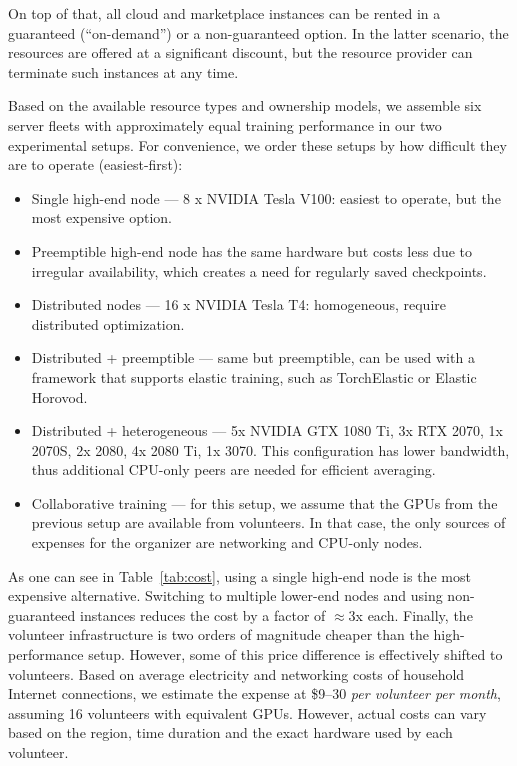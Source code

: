 On top of that, all cloud and marketplace instances can be rented in a guaranteed (``on-demand'') or a non-guaranteed option. In the latter scenario, the resources are offered at a significant discount, but the resource provider can terminate such instances at any time.

Based on the available resource types and ownership models, we assemble six server fleets with approximately equal training performance in our two experimental setups. For convenience, we order these setups by how difficult they are to operate (easiest-first):

\begin{itemize}[leftmargin=*]
    \item Single high-end node --- 8 x NVIDIA Tesla V100: easiest to operate, but the most expensive option.
    \item Preemptible high-end node has the same hardware but costs less due to irregular availability, which creates a need for regularly saved checkpoints.
    \item Distributed nodes --- 16 x NVIDIA Tesla T4: homogeneous, require distributed optimization.
    \item Distributed + preemptible --- same but preemptible, can be used with a framework that supports elastic training, such as TorchElastic\cite{pytorch_elastic} or Elastic Horovod\cite{elastic_horovod}.
    \item Distributed + heterogeneous --- 5x NVIDIA GTX 1080 Ti, 3x RTX 2070, 1x 2070S, 2x 2080, 4x 2080 Ti, 1x 3070. This configuration has lower bandwidth, thus additional CPU-only peers are needed for efficient averaging.
    \item Collaborative training --- for this setup, we assume that the GPUs from the previous setup are available from volunteers. In that case, the only sources of expenses for the organizer are networking and CPU-only nodes.
    
\end{itemize}

As one can see in Table~\ref{tab:cost}, using a single high-end node is the most expensive alternative. Switching to multiple lower-end nodes and using non-guaranteed instances reduces the cost by a factor of $\approx3$x each. Finally, the volunteer infrastructure is two orders of magnitude cheaper than the high-performance setup. However, some of this price difference is effectively shifted to volunteers. Based on average electricity and networking costs of household Internet connections, we estimate the expense at \$9--30 \textit{per volunteer per month}, assuming 16 volunteers with equivalent GPUs. However, actual costs can vary based on the region, time duration and the exact hardware used by each volunteer.

